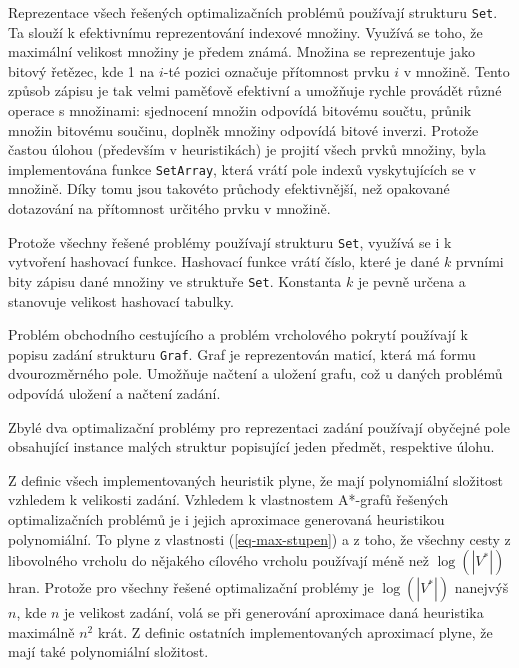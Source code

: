 \documentclass[12pt,notitlepage,fleqn]{report} %
\theoremstyle{definition}
\newcommand{\code}[1]{\texttt{#1}}
\begin{document}
    Reprezentace všech řešených optimalizačních problémů používají strukturu \code{Set}. Ta slouží k efektivnímu reprezentování indexové množiny. Využívá se toho, že maximální velikost množiny je předem známá. Množina se reprezentuje jako bitový řetězec, kde 1 na $i$-té pozici označuje přítomnost prvku $i$ v množině. Tento způsob zápisu je tak velmi paměťově efektivní a umožňuje rychle provádět různé operace s množinami: sjednocení množin odpovídá bitovému součtu, průnik množin bitovému součinu, doplněk množiny odpovídá bitové inverzi. Protože častou úlohou (především v heuristikách) je projití všech prvků množiny, byla implementována funkce \code{SetArray}, která vrátí pole indexů vyskytujících se v množině. Díky tomu jsou takovéto průchody efektivnější, než opakované dotazování na přítomnost určitého prvku v množině.

    Protože všechny řešené problémy používají strukturu \code{Set}, využívá se i k vytvoření hashovací funkce. Hashovací funkce vrátí číslo, které je dané $k$ prvními bity zápisu dané množiny ve struktuře \code{Set}. Konstanta $k$ je pevně určena a stanovuje velikost hashovací tabulky.

    Problém obchodního cestujícího a problém vrcholového pokrytí používají k popisu zadání strukturu \code{Graf}. Graf je reprezentován maticí, která má formu dvourozměrného pole. Umožňuje načtení a uložení grafu, což u daných problémů odpovídá uložení a načtení zadání.

    Zbylé dva optimalizační problémy pro reprezentaci zadání používají obyčejné pole obsahující instance malých struktur popisující jeden předmět, respektive úlohu.
    
    Z definic všech implementovaných heuristik plyne, že mají polynomiální složitost vzhledem k velikosti zadání.
    Vzhledem k vlastnostem A*-grafů řešených optimalizačních problémů je i jejich aproximace generovaná heuristikou polynomiální. To plyne z vlastnosti (\ref{eq-max-stupen}) a z toho, že všechny cesty z libovolného vrcholu do nějakého cílového vrcholu používají méně než $\log(|V^*|)$ hran. Protože pro všechny řešené optimalizační problémy je $\log(|V^*|)$ nanejvýš $n$, kde $n$ je velikost zadání, volá se při generování aproximace daná heuristika maximálně $n^2$ krát.
    Z definic ostatních implementovaných aproximací plyne, že mají také polynomiální složitost.
    
\end{document}
